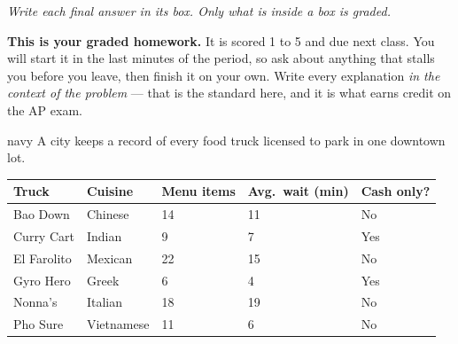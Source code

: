 \documentclass[10pt]{article}
\begin{document}
{\small\itshape Write each final answer in its box. Only what is inside a box is graded.}\par

\vspace{0.12in}

\boxguard[8]
\begin{remindbox}
\small
\textbf{This is your graded homework.} It is scored 1 to 5 and due next class. You will start it in the
last minutes of the period, so ask about anything that stalls you before you leave, then finish
it on your own. Write every explanation \emph{in the context of the problem} --- that is the
standard here, and it is what earns credit on the AP exam.
\end{remindbox}

\vspace{0.10in}

\boxguard[24]
\begin{scenariobox}{navy}
\small
A city keeps a record of every food truck licensed to park in one downtown lot.

\vspace{6pt}
\renewcommand{\arraystretch}{1.15}
\begin{tabularx}{\linewidth}{@{} l Y Y Y Y @{}}
\textbf{Truck} & \textbf{Cuisine} & \textbf{Menu items} & \textbf{Avg.\ wait (min)} & \textbf{Cash only?} \\
\hline
Bao Down     & Chinese & 14 & 11 & No  \\
Curry Cart   & Indian  &  9 &  7 & Yes \\
El Farolito  & Mexican & 22 & 15 & No  \\
Gyro Hero    & Greek   &  6 &  4 & Yes \\
Nonna's      & Italian & 18 & 19 & No  \\
Pho Sure     & Vietnamese & 11 & 6 & No \\
\hline
\end{tabularx}
\end{scenariobox}

\vspace{0.10in}
\end{document}
